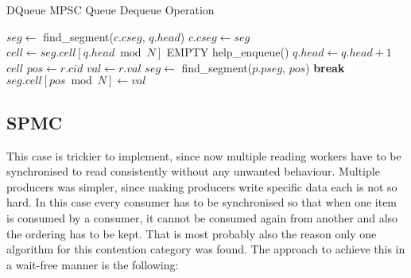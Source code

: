 \begin{algorithm}[!ht]
    \centering
    \captionsetup{justification=centering}
    \caption{DQueue \ac{MPSC} Queue Dequeue Operation \cite{WangCacheCoherent}}
    \label{alg:dqueue-dequeue}
    \scriptsize
    \begin{algorithmic}[1]
            \State $seg \gets$ find\_segment($c.cseg$, $q.head$)
                \State $c.cseg \gets seg$ 
            \EndIf
            \State $cell \gets seg.cell[q.head \bmod N]$
             
                    \State \Return EMPTY
                \Else
                    \State help\_enqueue() 
                \EndIf
            \EndIf
            \State $q.head \gets q.head + 1$ 
            \State \Return $cell$
        \EndFunction
        \State
                    \State $pos \gets r.cid$
                    \State $val \gets r.val$
                    \State $seg \gets$ find\_segment($p.pseg$, $pos$)
                        \State \textbf{break} 
                    \EndIf
                        \State $seg.cell[pos \bmod N] \gets val$ 
                    \EndIf
                \EndFor
            \EndFor
        \EndFunction
    \end{algorithmic}
\end{algorithm}

\subsection{\acf{SPMC}}\label{subsec:single-producer-and-multiple-consumer}
This case is trickier to implement, since now multiple reading workers have to be synchronised to read consistently without any unwanted behaviour. Multiple producers was simpler, since making producers write specific data each is not so hard. In this case every consumer has to be synchronised so that when one item is consumed by a consumer, it cannot be consumed again from another and also the ordering has to be kept. That is most probably also the reason only one algorithm for this contention category was found. The approach to achieve this in a wait-free manner is the following:

